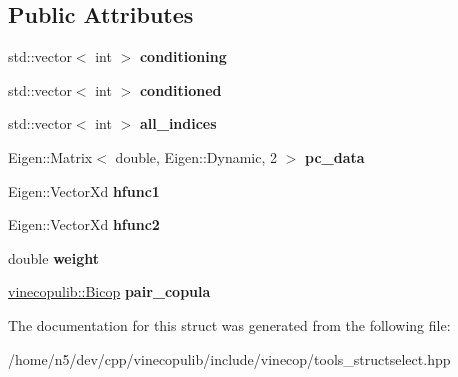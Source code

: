 \subsection*{Public Attributes}
\begin{DoxyCompactItemize}
\item 
std\+::vector$<$ int $>$ {\bfseries conditioning}\hypertarget{structtools__structselect_1_1_edge_properties_af1e7de6d74393979de88e44bf2c557ee}{}\label{structtools__structselect_1_1_edge_properties_af1e7de6d74393979de88e44bf2c557ee}

\item 
std\+::vector$<$ int $>$ {\bfseries conditioned}\hypertarget{structtools__structselect_1_1_edge_properties_a5a270d3231ea16f05842507bf573bf30}{}\label{structtools__structselect_1_1_edge_properties_a5a270d3231ea16f05842507bf573bf30}

\item 
std\+::vector$<$ int $>$ {\bfseries all\+\_\+indices}\hypertarget{structtools__structselect_1_1_edge_properties_a8dfda49109ee30a62ed0d72c62bef097}{}\label{structtools__structselect_1_1_edge_properties_a8dfda49109ee30a62ed0d72c62bef097}

\item 
Eigen\+::\+Matrix$<$ double, Eigen\+::\+Dynamic, 2 $>$ {\bfseries pc\+\_\+data}\hypertarget{structtools__structselect_1_1_edge_properties_ae09942e4f0d693b7dbd57e76811dc428}{}\label{structtools__structselect_1_1_edge_properties_ae09942e4f0d693b7dbd57e76811dc428}

\item 
Eigen\+::\+Vector\+Xd {\bfseries hfunc1}\hypertarget{structtools__structselect_1_1_edge_properties_a77140ff15d58ae967314469923b60149}{}\label{structtools__structselect_1_1_edge_properties_a77140ff15d58ae967314469923b60149}

\item 
Eigen\+::\+Vector\+Xd {\bfseries hfunc2}\hypertarget{structtools__structselect_1_1_edge_properties_a188f5a0a16eb5b05beb287756d4a935f}{}\label{structtools__structselect_1_1_edge_properties_a188f5a0a16eb5b05beb287756d4a935f}

\item 
double {\bfseries weight}\hypertarget{structtools__structselect_1_1_edge_properties_a0a455e1dd0a6ea89a2a5d7c7ed3289d7}{}\label{structtools__structselect_1_1_edge_properties_a0a455e1dd0a6ea89a2a5d7c7ed3289d7}

\item 
\hyperlink{classvinecopulib_1_1_bicop}{vinecopulib\+::\+Bicop} {\bfseries pair\+\_\+copula}\hypertarget{structtools__structselect_1_1_edge_properties_ae84b0141db39d2708b2b08b5ecdcf6ff}{}\label{structtools__structselect_1_1_edge_properties_ae84b0141db39d2708b2b08b5ecdcf6ff}

\end{DoxyCompactItemize}


The documentation for this struct was generated from the following file\+:\begin{DoxyCompactItemize}
\item 
/home/n5/dev/cpp/vinecopulib/include/vinecop/tools\+\_\+structselect.\+hpp\end{DoxyCompactItemize}
